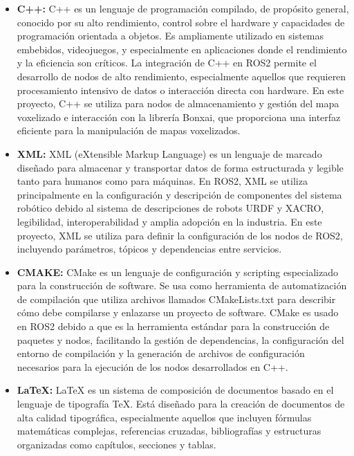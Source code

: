 \documentclass[12pt, a4paper, twoside]{article}
\begin{document}
\begin{itemize}
\begin{minipage}[r]{0.28\textwidth}
  \end{minipage}
  \item \textbf{C++:} C++ es un lenguaje de programación compilado, de propósito general, conocido por su alto rendimiento, 
  control sobre el hardware y capacidades de programación orientada a objetos. Es ampliamente utilizado en sistemas embebidos, 
  videojuegos, y especialmente en aplicaciones donde el rendimiento y la eficiencia son críticos. La integración de C++
  en ROS2 permite el desarrollo de nodos de alto rendimiento, especialmente aquellos que requieren procesamiento intensivo
  de datos o interacción directa con hardware. En este proyecto, C++ se utiliza para nodos de almacenamiento y gestión del
  mapa voxelizado e interacción con la librería Bonxai, que proporciona una interfaz eficiente para la manipulación de mapas
  voxelizados.
  \item \textbf{XML:} XML (eXtensible Markup Language) es un lenguaje de marcado diseñado para almacenar y 
  transportar datos de forma estructurada y legible tanto para humanos como para máquinas. En ROS2, XML se utiliza principalmente 
  en la configuración y descripción de componentes del sistema robótico debido al sistema de descripciones de robots URDF y 
  XACRO, legibilidad, interoperabilidad y amplia adopción en la industria. En este proyecto, XML se utiliza para
  definir la configuración de los nodos de ROS2, incluyendo parámetros, tópicos y dependencias entre servicios.
  \item \textbf{CMAKE:} CMake es un lenguaje de configuración y scripting especializado para la construcción de software.
  Se usa como herramienta de automatización de compilación que utiliza archivos llamados CMakeLists.txt para describir 
  cómo debe compilarse y enlazarse un proyecto de software. CMake es usado en ROS2 debido a que es la herramienta 
  estándar para la construcción de paquetes y nodos, facilitando la gestión de dependencias, la configuración del entorno
  de compilación y la generación de archivos de configuración necesarios para la ejecución de los nodos desarrollados en C++.
  \item \textbf{LaTeX:} LaTeX es un sistema de composición de documentos basado en el lenguaje de tipografía TeX. Está 
  diseñado para la creación de documentos de alta calidad tipográfica, especialmente aquellos que incluyen fórmulas matemáticas 
  complejas, referencias cruzadas, bibliografías y estructuras organizadas como capítulos, secciones y tablas.
\end{itemize}
\end{document}

